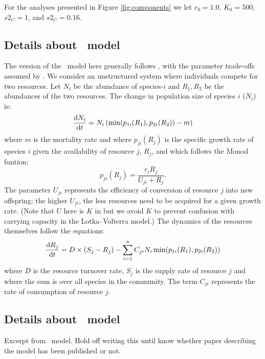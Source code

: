 \documentclass[a4paper,11pt]{article}
\begin{document}
For the analyses presented in Figure \ref{fig:components} we let $r_0=1.0$, $K_0=500$,
 $s2_C=1$, and $s2_C=0.16$.

\subsection{Details about \Rstar\ model}\label{sec:Rstar}

The version of the \Rstar\ model here generally follows
\citet{Huisman-2001}, with the parameter trade-offs assumed by
\citet{Fox-2008}.
%
We consider an unstructured system where individuals compete for two
resources. Let $N_i$ be the abundance of species-$i$ and $R_1, R_2$ be
the abundances of the two resources.
%
The change in population size of species $i$ ($N_i$) is:
\begin{equation}
  \label{eq:rstar-n}
  \frac{\mathrm{d} N_i}{\mathrm{d} t} = N_i \, (\min(p_{1i}(R_1), p_{2i}(R_2)) - m)
\end{equation}
where $m$ is the mortality rate and where $p_{ji}(R_j)$ is the
specific growth rate of species $i$ given the availability of resource
$j$, $R_j$, and which follows the Monod funtion:
\begin{equation}
  \label{eq:rstar-p}
  p_{ji}(R_j) = \frac{r_i R_j}{U_{ji} + R_j}.
\end{equation}
%
The parameter $U_{ji}$ represents the efficiency of conversion of
resource $j$ into new offspring; the higher $U_{ji}$, the less
resources need to be acquired for a given growth rate.  (Note that $U$
here is $K$ in \citealt{Huisman-2001} but we avoid $K$ to prevent
confusion with carrying capacity in the Lotka--Volterra model.)
%
The dynamics of the resources themselves follow the equations:
\begin{equation}
  \label{eq:rstar-r}
  \frac{\mathrm{d} R_j}{\mathrm{d} t} =
  D \times (S_j - R_j) - \sum_{i=1}^n {C_{ji} N_i
    \min(p_{1i}(R_1), p_{2i}(R_2))}
\end{equation}
where $D$ is the resource turnover rate, $S_j$ is the supply rate of
resource $j$ and where the sum is over all species in the community.
The term $C_{ji}$ represents the rate of consumption of resource $j$.


\subsection{Details about \plant\ model}\label{sec:plant}

Excerpt from  \plant\ model. Hold off writing this until know whether paper describing
the model has been published or not.
\end{document}
